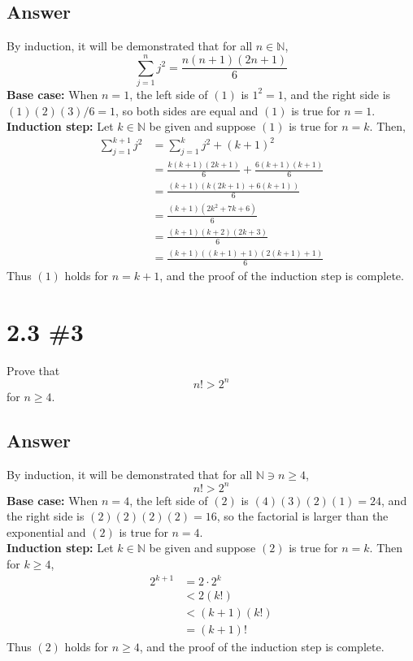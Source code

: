 \documentclass[
	12pt, %
]{fphw}
\newcommand\qed{\text{$\blacksquare$}}
\newcommand\N{\mathbb{N}}
\begin{document}
\subsection*{Answer} By induction, it will be demonstrated that for all $n \in \N{}$,
\begin{equation} \label{eq1}
\sum_{j = 1}^n j^2 = \frac{n(n+1)(2n+1)}{6}
\end{equation}
\textbf{Base case:} When $n = 1$, the left side of $(1)$ is $1^2 = 1$, and the right side is $(1)(2)(3)/6 = 1$, so both sides are equal and $(1)$ is true for $n=1$.\\
\textbf{Induction step:} Let $k \in \N{}$ be given and suppose $(1)$ is true for $n = k$. Then,
\begin{align*}
\sum_{j = 1}^{k+1} j^2 &= \sum_{j = 1}^{k} j^2 + (k + 1)^2\\
&=\frac{k(k+1)(2k+1)}{6} + \frac{6(k + 1)(k + 1)}{6}\\
&=\frac{(k+1)(k(2k+1)+6(k+1))}{6}\\
&=\frac{(k+1)(2k^2+7k + 6)}{6}\\
&=\frac{(k+1)(k+2)(2k+3)}{6}\\
&=\frac{(k+1)((k+1)+1)(2(k+1) + 1)}{6}
\end{align*}
Thus $(1)$ holds for $n = k + 1$, and the proof of the induction step is complete. \qed
\newpage
\section*{2.3 \#3}

\begin{problem}
Prove that
$$
n! > 2^n
$$
for $n \ge 4$.
\end{problem}


\subsection*{Answer} By induction, it will be demonstrated that for all $\N{} \ni n \ge 4$,
\begin{equation} \label{eq1}
n! > 2^n
\end{equation}
\textbf{Base case:} When $n = 4$, the left side of $(2)$ is $(4)(3)(2)(1) = 24$, and the right side is $(2)(2)(2)(2) = 16$, so the factorial is larger than the exponential and $(2)$ is true for $n=4$.\\
\textbf{Induction step:} Let $k \in \N{}$ be given and suppose $(2)$ is true for $n = k$. Then for $k \ge 4$,
\begin{align*}
2^{k+1} &= 2 \cdot 2^k\\
&< 2(k!)\\
&< (k+1)(k!)\\
&= (k+1)!
\end{align*}
Thus $(2)$ holds for $n \ge 4$, and the proof of the induction step is complete. \qed
\end{document}
